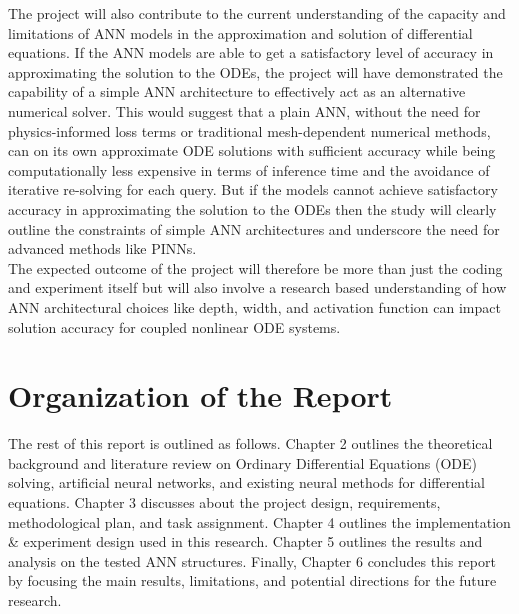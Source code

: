 The project will also contribute to the current understanding of the capacity
and limitations of ANN models in the approximation and solution of differential 
equations. If the ANN models are able to get a satisfactory level of accuracy in 
approximating the solution to the ODEs, the project will have demonstrated 
the capability of a simple ANN architecture to effectively act as an alternative 
numerical solver. This would suggest that a plain ANN, without the need for 
physics-informed loss terms or traditional mesh-dependent numerical 
methods, can on its own approximate ODE solutions with sufficient accuracy 
while being computationally less expensive in terms of inference time and the 
avoidance of iterative re-solving for each query. But if the models cannot 
achieve satisfactory accuracy in approximating the solution to the ODEs then 
the study will clearly outline the constraints of simple ANN architectures and 
underscore the need for advanced methods like PINNs. \\[1pt]

The expected outcome of the project will therefore be more than just the 
coding and experiment itself but will also involve a research based 
understanding of how ANN architectural choices like depth, width, and 
activation function can impact solution accuracy for coupled nonlinear ODE 
systems.


\section{Organization of the Report}
The rest of this report is outlined as follows. Chapter 2 outlines the theoretical 
background and literature review on Ordinary Differential Equations (ODE) 
solving, artificial neural networks, and existing neural methods for differential 
equations. Chapter 3 discusses about the project design, requirements, 
methodological plan, and task assignment. Chapter 4 outlines the 
implementation \& experiment design used in this research. Chapter 5 outlines 
the results and analysis on the tested ANN structures. Finally, Chapter 6 
concludes this report by focusing the main results, limitations, and potential 
directions for the future research. 
